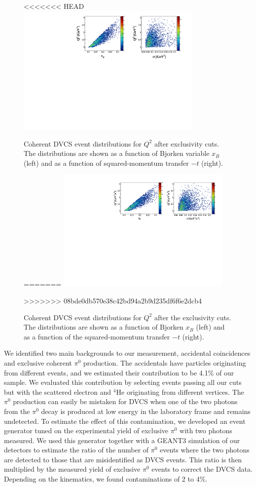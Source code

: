 \documentclass[twocolumn,nofootinbib,showpacs,prl,superscriptaddress,secnumarabic,amssymb,nobibnotes,aps,floatfix]{revtex4}
\begin{document}
\begin{figure}[tb]
\hspace{-0.45cm}
<<<<<<< HEAD
\includegraphics[width=9cm]{figs/F_Q2_xB_t_Coh.pdf}
\caption{Coherent DVCS event distributions for $Q^2$ after exclusivity cuts. 
The distributions are shown as a function of Bjorken variable $x_B$ (left) 
and as a function of squared-momentum transfer $-t$ (right).}
=======
\includegraphics[width=8.5cm]{figs/Q2_xB_t_Coh.pdf}
\caption{Coherent DVCS event distributions for $Q^2$ after the exclusivity cuts. 
The distributions are shown as a function of Bjorken $x_B$ (left) 
and as a function of the squared-momentum transfer $-t$ (right).}
>>>>>>> 08bde0db570e38c42bd94a2b9d235df6f6e2dcb4
\label{fig:kin-coverage}
\end{figure}

We identified two main backgrounds to our measurement, accidental coincidences 
and exclusive coherent
$\pi^0$ production. The accidentals have particles originating from different events,
and we estimated their contribution to be 4.1\% of our sample. We evaluated this 
contribution by selecting events passing all our cuts but with the scattered electron and 
$^4$He originating from different vertices. The $\pi^0$ production can easily
be mistaken for DVCS when one of the two photons from the $\pi^0$ 
decay is produced at low energy in the laboratory frame and remains undetected.  
To estimate the effect of this contamination, we developed an event generator 
tuned on the experimental yield of exclusive $\pi^0$ with two photons measured. 
We used this generator together with a GEANT3 simulation of our 
detectors to estimate the ratio of the number of $\pi^0$ events where the 
two photons are detected to those that are misidentified as DVCS events. This 
ratio is then multiplied by the measured yield of exclusive $\pi^0$ events to 
correct the DVCS data. Depending on the kinematics, we found contaminations of 
2 to 4\%. 
\end{document}
